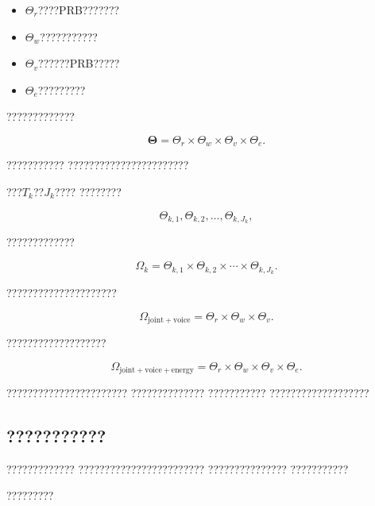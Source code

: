 \begin{itemize}
    \item $\Theta_r$????PRB???????
    \item $\Theta_w$???????????
    \item $\Theta_v$??????PRB?????
    \item $\Theta_e$?????????
\end{itemize}

?????????????

\begin{equation}
\boldsymbol{\Theta}
=
\Theta_r
\times
\Theta_w
\times
\Theta_v
\times
\Theta_e.
\label{eq:discrete_policy_parameter_space}
\end{equation}

???????????
???????????????????????

???$T_k$??$J_k$????
????????

\begin{equation}
\Theta_{k,1},
\Theta_{k,2},
\ldots,
\Theta_{k,J_k},
\end{equation}

?????????????

\begin{equation}
\Omega_k
=
\Theta_{k,1}
\times
\Theta_{k,2}
\times
\cdots
\times
\Theta_{k,J_k}.
\label{eq:template_parameter_cartesian_product}
\end{equation}

?????????????????????

\begin{equation}
\Omega_{\mathrm{joint+voice}}
=
\Theta_r
\times
\Theta_w
\times
\Theta_v.
\label{eq:joint_voice_parameter_space}
\end{equation}

???????????????????

\begin{equation}
\Omega_{\mathrm{joint+voice+energy}}
=
\Theta_r
\times
\Theta_w
\times
\Theta_v
\times
\Theta_e.
\label{eq:joint_voice_energy_parameter_space}
\end{equation}

???????????????????????
??????????????
???????????
???????????????????


\subsection*{???????????}

?????????????
????????????????????????
???????????????
???????????

?????????

